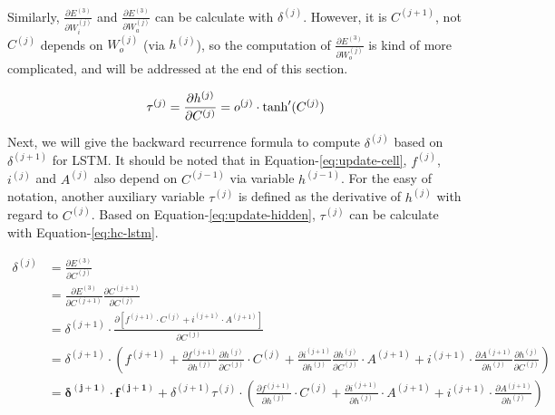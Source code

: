 \documentclass[english]{article}
\begin{document}
Similarly, $\frac{\partial E^{(3)}}{\partial W^{(j)}_i}$ and $\frac{\partial E^{(3)}}{\partial W^{(j)}_a}$ can be calculate with $\delta^{(j)}$. 
However, it is $C^{(j+1)}$,  not $C^{(j)}$ depends on $W^{(j)}_o$ (via $h^{(j)}$),  so the computation of $\frac{\partial E^{(3)}}{\partial W^{(j)}_o}$ is 
kind of more complicated, and will be addressed at the end of this section.


 \begin{equation}\label{eq:hc-lstm}
    \tau^{(j)} = \frac{\partial h^{(j)}}{\partial C^{(j)}} = o^{(j)} \cdot \tanh'(C^{(j)})\\
\end{equation}


Next, we will give the backward recurrence formula to compute $\delta^{(j)}$ based on $\delta^{(j+1)}$ for LSTM. 
It should be noted that in Equation-\ref{eq:update-cell}, $f^{(j)}$, $i^{(j)}$ and $A^{(j)}$ also depend on $C^{(j-1)}$ via variable $h^{(j-1)}$. For the easy of notation, another auxiliary variable $\tau^{(j)}$ is defined as the derivative of $h^{(j)}$ with regard to $C^{(j)}$. Based on Equation-\ref{eq:update-hidden}, $\tau^{(j)}$ can be calculate with Equation-\ref{eq:hc-lstm}.

 \begin{equation}\label{eq:delta-lstm-recurrence}
 \begin{split}
    \delta^{(j)} &= \frac{\partial E^{(3)}}{\partial C^{(j)}} \\
                     &=  \frac{\partial E^{(3)}}{\partial C^{(j+1)}}  \frac{\partial C^{(j+1)}}{\partial C^{(j)}} \\
                     &= \delta^{(j+1)} \cdot  \frac{\partial [f^{(j+1)} \cdot C^{(j)} + i^{(j+1)}  \cdot A^{(j+1)}]}{\partial C^{(j)}} \\
                     &= \delta^{(j+1)} \cdot (f^{(j+1)}  + \frac{\partial f^{(j+1)}}{\partial h^{(j)}}\frac{\partial h^{(j)}}{\partial C^{(j)}} \cdot C^{(j)} +
                         \frac{\partial i^{(j+1)}}{\partial h^{(j)}}\frac{\partial h^{(j)}}{\partial C^{(j)}} \cdot A^{(j+1)} +
                         i^{(j+1)}  \cdot \frac{\partial A^{(j+1)}}{\partial h^{(j)}}\frac{\partial h^{(j)}}{\partial C^{(j)}})\\
                    &= \pmb{\delta^{(j+1)} \cdot f^{(j+1)} } + 
                           \delta^{(j+1)} \tau^{(j)} \cdot (\frac{\partial f^{(j+1)}}{\partial h^{(j)}} \cdot C^{(j)} +
                                                                         \frac{\partial i^{(j+1)}}{\partial h^{(j)}} \cdot A^{(j+1)} +
                                                                        i^{(j+1)} \cdot \frac{\partial A^{(j+1)}}{\partial h^{(j)}})\\
 \end{split}                       
\end{equation}
\end{document}
